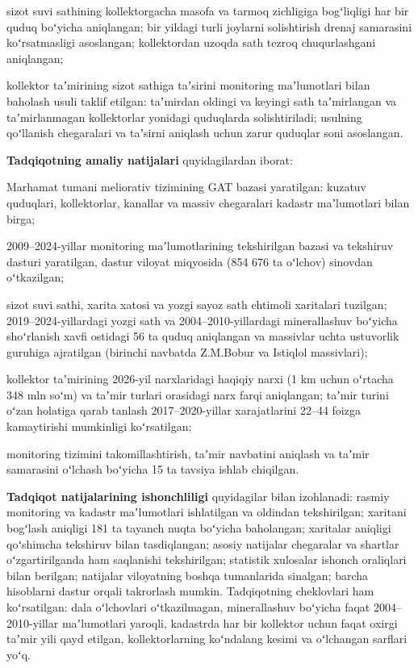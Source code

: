 \documentclass[14pt,a4paper,oneside]{extreport}
\begin{document}
sizot suvi sathining kollektorgacha masofa va tarmoq zichligiga
bogʻliqligi har bir quduq boʻyicha aniqlangan; bir yildagi turli
joylarni solishtirish drenaj samarasini koʻrsatmasligi asoslangan;
kollektordan uzoqda sath tezroq chuqurlashgani aniqlangan;

kollektor taʼmirining sizot sathiga taʼsirini monitoring maʼlumotlari
bilan baholash usuli taklif etilgan: taʼmirdan oldingi va keyingi sath
taʼmirlangan va taʼmirlanmagan kollektorlar yonidagi quduqlarda
solishtiriladi; usulning qoʻllanish chegaralari va taʼsirni aniqlash
uchun zarur quduqlar soni asoslangan.

\textbf{Tadqiqotning amaliy natijalari} quyidagilardan iborat:

Marhamat tumani meliorativ tizimining GAT bazasi yaratilgan: kuzatuv
quduqlari, kollektorlar, kanallar va massiv chegaralari kadastr
maʼlumotlari bilan birga;

2009--2024-yillar monitoring maʼlumotlarining tekshirilgan bazasi va
tekshiruv dasturi yaratilgan, dastur viloyat miqyosida (854 676 ta
oʻlchov) sinovdan oʻtkazilgan;

sizot suvi sathi, xarita xatosi va yozgi sayoz sath ehtimoli xaritalari
tuzilgan; 2019--2024-yillardagi yozgi sath va 2004--2010-yillardagi
minerallashuv boʻyicha shoʻrlanish xavfi ostidagi 56 ta quduq aniqlangan
va massivlar uchta ustuvorlik guruhiga ajratilgan (birinchi navbatda
Z.M.Bobur va Istiqlol massivlari);

kollektor taʼmirining 2026-yil narxlaridagi haqiqiy narxi (1 km uchun
oʻrtacha 348 mln soʻm) va taʼmir turlari orasidagi narx farqi
aniqlangan; taʼmir turini oʻzan holatiga qarab tanlash 2017--2020-yillar
xarajatlarini 22--44 foizga kamaytirishi mumkinligi koʻrsatilgan;

monitoring tizimini takomillashtirish, taʼmir navbatini aniqlash va
taʼmir samarasini oʻlchash boʻyicha 15 ta tavsiya ishlab chiqilgan.

\textbf{Tadqiqot natijalarining ishonchliligi} quyidagilar bilan
izohlanadi: rasmiy monitoring va kadastr maʼlumotlari ishlatilgan va
oldindan tekshirilgan; xaritani bogʻlash aniqligi 181 ta tayanch nuqta
boʻyicha baholangan; xaritalar aniqligi qoʻshimcha tekshiruv bilan
tasdiqlangan; asosiy natijalar chegaralar va shartlar oʻzgartirilganda
ham saqlanishi tekshirilgan; statistik xulosalar ishonch oraliqlari
bilan berilgan; natijalar viloyatning boshqa tumanlarida sinalgan;
barcha hisoblarni dastur orqali takrorlash mumkin. Tadqiqotning
cheklovlari ham koʻrsatilgan: dala oʻlchovlari oʻtkazilmagan,
minerallashuv boʻyicha faqat 2004--2010-yillar maʼlumotlari yaroqli,
kadastrda har bir kollektor uchun faqat oxirgi taʼmir yili qayd etilgan,
kollektorlarning koʻndalang kesimi va oʻlchangan sarflari yoʻq.
\end{document}
